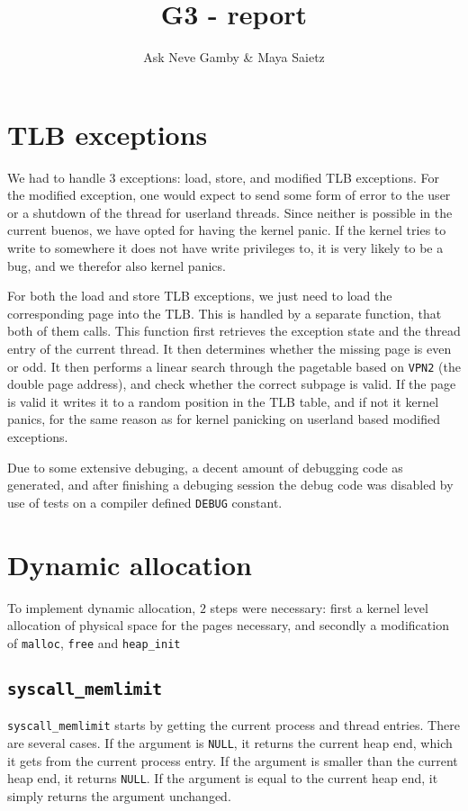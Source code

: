 \documentclass{article}
\title{G3 - report}
\author{Ask Neve Gamby \& Maya Saietz}
\begin{document}
\maketitle
%
\section{TLB exceptions}
%
We had to handle 3 exceptions: load, store, and modified TLB exceptions. For the modified exception, one would expect to send some form of error to the user or a shutdown of the thread for userland threads. Since neither is possible in the current buenos, we have opted for having the kernel panic. If the kernel tries to write to somewhere it does not have write privileges to, it is very likely to be a bug, and we therefor also kernel panics.

For both the load and store TLB exceptions, we just need to load the corresponding page into the TLB. This is handled by a separate function, that both of them calls. This function first retrieves the exception state and the thread entry of the current thread. It then determines whether the missing page is even or odd. It then performs a linear search through the pagetable based on \texttt{VPN2} (the double page address), and check whether the correct subpage is valid. If the page is valid it writes it to a random position in the TLB table, and if not it kernel panics, for the same reason as for kernel panicking on userland based modified exceptions.

Due to some extensive debuging, a decent amount of debugging code as generated, and after finishing a debuging session the debug code was disabled by use of tests on a compiler defined \texttt{DEBUG} constant.
%
\section{Dynamic allocation}
%
To implement dynamic allocation, $2$ steps were necessary: first a kernel level allocation of physical space for the pages necessary, and secondly a modification of \texttt{malloc}, \texttt{free} and \texttt{heap\_init}
%
\subsection{\texttt{syscall\_memlimit}}
%
\texttt{syscall\_memlimit} starts by getting the current process and thread entries. There are several cases. If the argument is \texttt{NULL}, it returns the current heap end, which it gets from the current process entry. If the argument is smaller than the current heap end, it returns \texttt{NULL}. If the argument is equal to the current heap end, it simply returns the argument unchanged.
\end{document}
